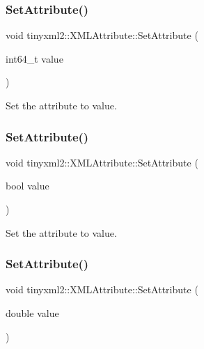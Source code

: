 \subsubsection{\texorpdfstring{Set\+Attribute()}{SetAttribute()}\hspace{0.1cm}{\footnotesize\ttfamily [4/7]}}
{\footnotesize\ttfamily void tinyxml2\+::\+X\+M\+L\+Attribute\+::\+Set\+Attribute (\begin{DoxyParamCaption}\item[{int64\+\_\+t}]{value }\end{DoxyParamCaption})}



Set the attribute to value. 

\mbox{\label{classtinyxml2_1_1_x_m_l_attribute_ab3516def4fe058fe328f2b89fc2d77da}} 
\subsubsection{\texorpdfstring{Set\+Attribute()}{SetAttribute()}\hspace{0.1cm}{\footnotesize\ttfamily [5/7]}}
{\footnotesize\ttfamily void tinyxml2\+::\+X\+M\+L\+Attribute\+::\+Set\+Attribute (\begin{DoxyParamCaption}\item[{bool}]{value }\end{DoxyParamCaption})}



Set the attribute to value. 

\mbox{\label{classtinyxml2_1_1_x_m_l_attribute_a9a65ab3147abe8ccbbd373ce8791e818}} 
\subsubsection{\texorpdfstring{Set\+Attribute()}{SetAttribute()}\hspace{0.1cm}{\footnotesize\ttfamily [6/7]}}
{\footnotesize\ttfamily void tinyxml2\+::\+X\+M\+L\+Attribute\+::\+Set\+Attribute (\begin{DoxyParamCaption}\item[{double}]{value }\end{DoxyParamCaption})}




